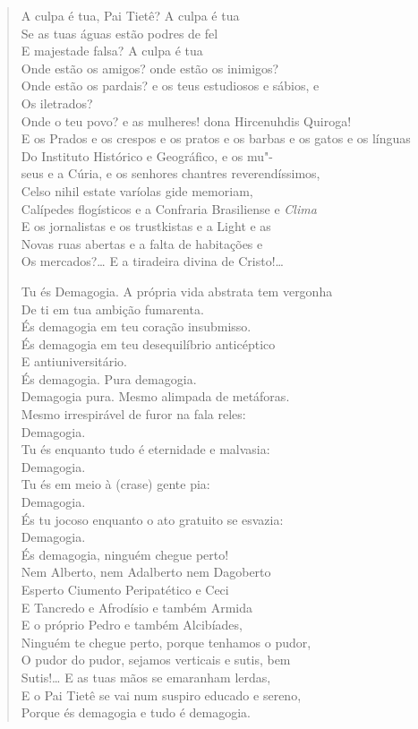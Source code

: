 {\begin{verse}
A culpa é tua, Pai Tietê? A culpa é tua\\
Se as tuas águas estão podres de fel\\
E majestade falsa? A culpa é tua\\
Onde estão os amigos? onde estão os inimigos?\\
Onde estão os pardais? e os teus estudiosos e sábios, e\\
Os iletrados?\\
Onde o teu povo? e as mulheres! dona Hircenuhdis Quiroga!\\
E os Prados e os crespos e os pratos e os barbas e os gatos e os línguas\\
Do Instituto Histórico e Geográfico, e os mu"-\\
seus e a Cúria, e os senhores chantres reverendíssimos,\\
Celso nihil estate varíolas gide memoriam,\\
Calípedes flogísticos e a Confraria Brasiliense e \emph{Clima}\\
E os jornalistas e os trustkistas e a Light e as\\
Novas ruas abertas e a falta de habitações e\\
Os mercados?\ldots{} E a tiradeira divina de Cristo!\ldots{}

Tu és Demagogia. A própria vida abstrata tem vergonha\\
De ti em tua ambição fumarenta.\\
És demagogia em teu coração insubmisso.\\
És demagogia em teu desequilíbrio anticéptico\\
E antiuniversitário.\\
És demagogia. Pura demagogia.\\
Demagogia pura. Mesmo alimpada de metáforas.\\
Mesmo irrespirável de furor na fala reles:\\
Demagogia.\\
Tu és enquanto tudo é eternidade e malvasia:\\
Demagogia.\\
Tu és em meio à (crase) gente pia:\\
Demagogia.\\
És tu jocoso enquanto o ato gratuito se esvazia:\\
Demagogia.\\
És demagogia, ninguém chegue perto!\\
Nem Alberto, nem Adalberto nem Dagoberto\\
Esperto Ciumento Peripatético e Ceci\\
E Tancredo e Afrodísio e também Armida\\
E o próprio Pedro e também Alcibíades,\\
Ninguém te chegue perto, porque tenhamos o pudor,\\
O pudor do pudor, sejamos verticais e sutis, bem\\
Sutis!\ldots{} E as tuas mãos se emaranham lerdas,\\
E o Pai Tietê se vai num suspiro educado e sereno,\\
Porque és demagogia e tudo é demagogia.


\end{verse}}
